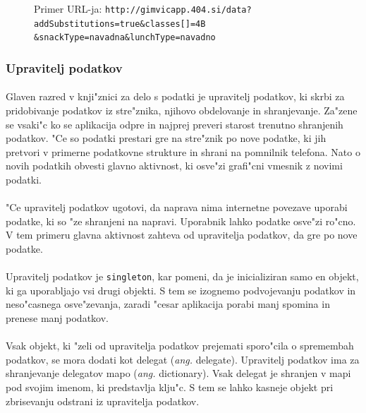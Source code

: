 \begin{figure}[!h]
	\centering
	Primer URL-ja:
	\texttt{http://gimvicapp.404.si/data?addSubstitutions=true\&classes[]=4B\\\&snackType=navadna\&lunchType=navadno}
\end{figure}

\subsubsection{Upravitelj podatkov}
\paragraph{}
Glaven razred v knji"znici za delo s podatki je upravitelj podatkov, ki skrbi za pridobivanje podatkov iz stre"znika, njihovo obdelovanje in shranjevanje. Za"zene se vsaki"c ko se aplikacija odpre in najprej preveri starost trenutno shranjenih podatkov. "Ce so podatki prestari gre na stre"znik po nove podatke, ki jih pretvori v primerne podatkovne strukture in shrani na pomnilnik telefona. Nato o novih podatkih obvesti glavno aktivnost, ki osve"zi grafi"cni vmesnik z novimi podatki.

\paragraph{}
"Ce upravitelj podatkov ugotovi, da naprava nima internetne povezave uporabi podatke, ki so "ze shranjeni na napravi. Uporabnik lahko podatke osve"zi ro"cno. V tem primeru glavna aktivnost zahteva od upravitelja podatkov, da gre po nove podatke.

\paragraph{}
Upravitelj podatkov je \texttt{singleton}, kar pomeni, da je inicializiran samo en objekt, ki ga uporabljajo vsi drugi objekti. S tem se izognemo podvojevanju podatkov in neso"casnega osve"zevanja, zaradi "cesar aplikacija porabi manj spomina in prenese manj podatkov.

\paragraph{}
Vsak objekt, ki "zeli od upravitelja podatkov prejemati sporo"cila o spremembah podatkov, se mora dodati kot delegat (\textit{ang.} delegate). Upravitelj podatkov ima za shranjevanje delegatov mapo (\textit{ang.} dictionary). Vsak delegat je shranjen v mapi pod svojim imenom, ki predstavlja klju"c. S tem se lahko kasneje objekt pri zbrisevanju odstrani iz upravitelja podatkov. 

